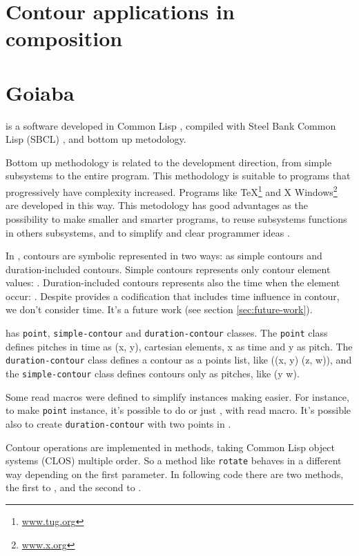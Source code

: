 \section{Contour applications in composition}
\label{sec:cont-appl-comp}

\section{Goiaba}
\label{sec:goiaba}

\goiaba{} is a software developed in Common Lisp \cite{graham94:lisp},
compiled with Steel Bank Common Lisp (SBCL) \cite{team07:sbcl}, and
bottom up metodology.

Bottom up methodology is related to the development direction, from
simple subsystems to the entire program. This methodology is suitable
to programs that progressively have complexity increased. Programs
like \TeX{}\footnote{\url{www.tug.org}} and X
Windows\footnote{\url{www.x.org}} are developed in this way. This
metodology has good advantages as the possibility to make smaller and
smarter programs, to reuse subsystems functions in others subsystems,
and to simplify and clear programmer ideas \cite{graham94:lisp}.

In \goiaba{}, contours are symbolic represented in two ways: as simple
contours and duration-included contours. Simple contours represents
only contour element values: . Duration-included
contours represents also the time when the element occur: . Despite \goiaba{} provides a codification that
includes time influence in contour, we don't consider time. It's a
future work (see section \ref{sec:future-work}).

\goiaba{} has \texttt{point}, \texttt{simple-contour} and
\texttt{duration-contour} classes. The \texttt{point} class defines
pitches in time as (x, y), cartesian elements, x as time and y as
pitch. The \texttt{duration-contour} class defines a contour as a
points list, like ((x, y) (z, w)), and the \texttt{simple-contour}
class defines contours only as pitches, like (y w).

Some read macros were defined to simplify instances making easier. For
instance, to make \texttt{point} instance, it's possible to do
 or just , with
read macro. It's possible also to create \texttt{duration-contour}
with two points in .

Contour operations are implemented in methods, taking Common Lisp
object systems (CLOS) multiple order. So a method like \texttt{rotate}
behaves in a different way depending on the first parameter. In
following code there are two methods, the first to
, and the second to .

